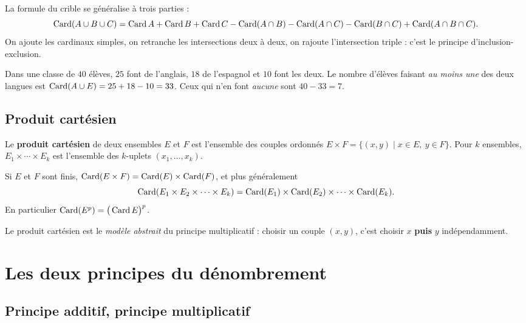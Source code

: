\begin{remarque}
La formule du crible se généralise à trois parties :
\[
\operatorname{Card}(A\cup B\cup C)=\operatorname{Card} A+\operatorname{Card} B+\operatorname{Card} C-\operatorname{Card}(A\cap B)-\operatorname{Card}(A\cap C)-\operatorname{Card}(B\cap C)+\operatorname{Card}(A\cap B\cap C).
\]
On ajoute les cardinaux simples, on retranche les intersections deux à deux, on rajoute
l'intersection triple : c'est le principe d'inclusion-exclusion.
\end{remarque}

\begin{exemple}
Dans une classe de $40$ élèves, $25$ font de l'anglais, $18$ de l'espagnol et $10$ font
les deux. Le nombre d'élèves faisant \emph{au moins une} des deux langues est
$\operatorname{Card}(A\cup E)=25+18-10=33$. Ceux qui n'en font \emph{aucune} sont $40-33=7$.
\end{exemple}

\subsection{Produit cartésien}

\begin{definition}
Le \textbf{produit cartésien} de deux ensembles $E$ et $F$ est l'ensemble des couples
ordonnés $E\times F=\{(x,y)\mid x\in E,\ y\in F\}$. Pour $k$ ensembles, $E_1\times\cdots\times E_k$
est l'ensemble des $k$-uplets $(x_1,\dots,x_k)$.
\end{definition}

\begin{propriete}
Si $E$ et $F$ sont finis, $\operatorname{Card}(E\times F)=\operatorname{Card}(E)\times\operatorname{Card}(F)$, et plus généralement
\[
\operatorname{Card}(E_1\times E_2\times\cdots\times E_k)=\operatorname{Card}(E_1)\times\operatorname{Card}(E_2)\times\cdots\times\operatorname{Card}(E_k).
\]
En particulier $\operatorname{Card}(E^{p})=\big(\operatorname{Card} E\big)^{p}$.
\end{propriete}

\begin{remarque}
Le produit cartésien est le \emph{modèle abstrait} du principe multiplicatif : choisir un
couple $(x,y)$, c'est choisir $x$ \textbf{puis} $y$ indépendamment.
\end{remarque}

\section{Les deux principes du dénombrement}

\subsection{Principe additif, principe multiplicatif}

